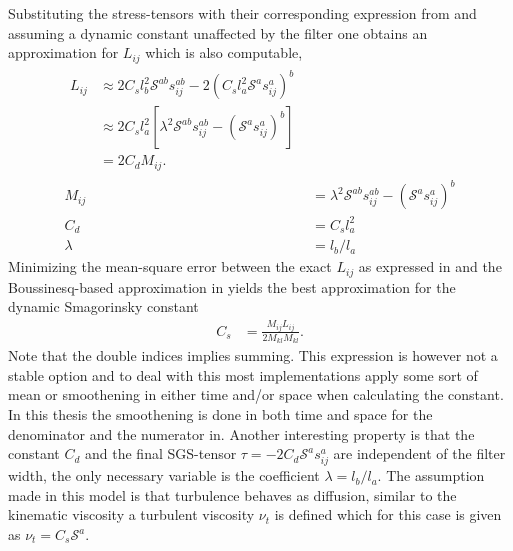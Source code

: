 Substituting the stress-tensors with their corresponding expression 
from and assuming a dynamic constant unaffected by the filter 
one obtains an approximation for $L_{ij}$ which is also computable,
\begin{align}
    \begin{split}
L_{ij} &\approx 2C_s l_b^2 \mathcal{S}^{ab} s^{ab}_{ij}
        -2 (C_s l_a^2 \mathcal{S}^a s^a_{ij})^b\\
        &\approx 2C_sl_a^2[\lambda^2\mathcal{S}^{ab}s^{ab}_{ij} 
        - (\mathcal{S}^{a}s^{a}_{ij})^b]\\
        &= 2C_d M_{ij}.
        \label{eq:lillystress}
    \end{split} \\
    M_{ij} &= \lambda^{2}\mathcal{S}^{ab}s_{ij}^{ab} - (\mathcal{S}^as_{ij}^a)^b\\
        C_d &= C_sl_a^2\\
        \lambda &= l_b/l_a
    \label{eq:dynsmagderivation}
\end{align}
Minimizing the mean-square error between the exact $L_{ij}$ as expressed in
and the Boussinesq-based approximation 
in yields the best approximation 
for the dynamic Smagorinsky constant 
%
\begin{align}
    C_s &= \frac{M_{ij}L_{ij}}{2M_{kl}M_{kl}}.
    \label{eq:dynsmag}
\end{align}
%
Note that the double indices implies summing. This expression is however not a 
stable option and to deal with this most implementations apply some sort of mean or smoothening 
in either time and/or space when calculating the constant. In this thesis the smoothening is done in 
both time and space for the denominator and the numerator in. Another interesting property 
is that the constant $C_d$ and the final SGS-tensor $\tau = -2C_d\mathcal{S}^as_{ij}^a$ are 
independent of the filter width, the only necessary variable is the coefficient $\lambda = l_b/l_a$.
The assumption made in this model is that turbulence behaves 
as diffusion, similar to the kinematic viscosity a turbulent viscosity $\nu_t$ is defined which for this case is given as 
$\nu_t = C_s\mathcal{S}^a$.

